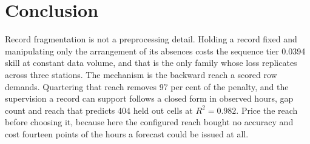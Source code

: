\documentclass[conference]{IEEEtran}
\begin{document}
\section{Conclusion}

Record fragmentation is not a preprocessing detail. Holding a record fixed and manipulating only
the arrangement of its absences costs the sequence tier 0.0394 skill at constant data volume,
and that is the only family whose loss replicates across three stations. The mechanism is the
backward reach a scored row demands. Quartering that reach removes 97 per cent of the penalty,
and the supervision a record can support follows a closed form in observed hours, gap count and
reach that predicts 404 held out cells at $R^2=0.982$. Price the reach before choosing it,
because here the configured reach bought no accuracy and cost fourteen points of the hours a
forecast could be issued at all.
\end{document}
